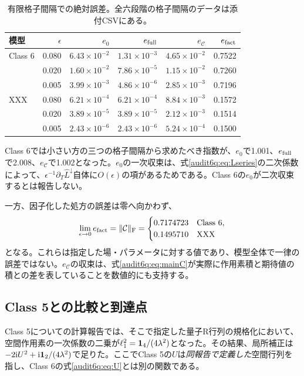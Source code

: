 \begin{table}[htbp]
\centering\small
\begin{tabular}{lrrrrr}
\toprule
模型&$\epsilon$&$e_0$&$e_{\rm full}$&$e_{\mathcal C}$&$e_{\rm fact}$\\\midrule
Class 6&0.080&$6.43\times10^{-2}$&$1.31\times10^{-3}$&$4.65\times10^{-2}$&0.7522\\
&0.020&$1.60\times10^{-2}$&$7.86\times10^{-5}$&$1.15\times10^{-2}$&0.7260\\
&0.005&$3.99\times10^{-3}$&$4.86\times10^{-6}$&$2.85\times10^{-3}$&0.7196\\\midrule
XXX&0.080&$6.21\times10^{-4}$&$6.21\times10^{-4}$&$8.84\times10^{-3}$&0.1572\\
&0.020&$3.89\times10^{-5}$&$3.89\times10^{-5}$&$2.12\times10^{-3}$&0.1514\\
&0.005&$2.43\times10^{-6}$&$2.43\times10^{-6}$&$5.24\times10^{-4}$&0.1500\\\bottomrule
\end{tabular}
\caption{有限格子間隔での絶対誤差。全六段階の格子間隔のデータは添付CSVにある。}
\label{audit6q:tab:spacing}
\end{table}

Class 6では小さい方の三つの格子間隔から求めたべき指数が、$e_0$で1.001、$e_{\rm full}$で2.008、$e_{\mathcal C}$で1.002となった。$e_0$の一次収束は、式\eqref{audit6q:eq:Lseries}の二次係数によって、$\epsilon^{-1}\partial_T\widehat L^\downarrow$自体に$O(\epsilon)$の項があるためである。Class 6の$e_0$が二次収束するとは報告しない。

一方、因子化した処方の誤差は零へ向かわず、
\begin{equation}
\lim_{\epsilon\to0}e_{\rm fact}=\|\mathcal C\|_{\rm F}
=\begin{cases}0.7174723&\text{Class 6},\\0.1495710&\text{XXX}\end{cases}
\label{audit6q:eq:limits}
\end{equation}
となる。これらは指定した場・パラメータに対する値であり、模型全体で一律の誤差ではない。$e_{\mathcal C}$の収束は、式\eqref{audit6q:eq:mainC}が実際に作用素積と期待値の積との差を表していることを数値的にも支持する。

\subsection{Class 5との比較と到達点}
\label{audit6q:sec:comparison}
Class 5についての計算報告では、そこで指定した量子R行列の規格化において、空間作用素の一次係数の二乗が$\ell_1^2=\mathbf 1_{4}/(4\lambda^2)$となった。その結果、局所補正は$-2\mathrm i U^2+\mathrm i\mathbf 1_{2}/(4\lambda^2)$で足りた。ここでClass 5の$U$は\emph{同報告で定義した}空間行列を指し、Class 6の式\eqref{audit6q:eq:U}とは別の関数である。

